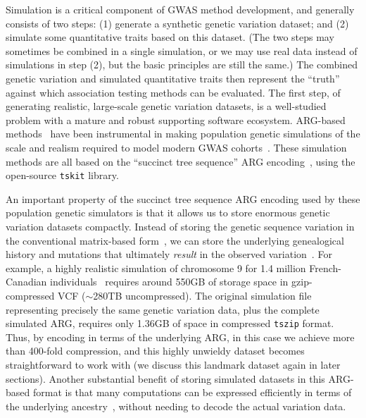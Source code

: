 \documentclass[unnumsec,webpdf,modern,large,namedate]{oup-authoring-template}%
\begin{document}
Simulation is a critical component of GWAS method development, and
generally consists of two steps: (1) generate a synthetic genetic
variation dataset; and (2) simulate some quantitative traits
based on this dataset.
(The two steps may sometimes be combined
in a single simulation, or we may use real data instead of simulations in
step (2), but the basic principles are still the same.)
The combined genetic variation and
simulated quantitative traits then represent the ``truth'' against
which association testing methods can be evaluated.
The first step, of generating realistic, large-scale genetic variation
datasets, is a well-studied problem with a mature and robust supporting
software ecosystem. ARG-based methods~\citep{kelleher2016efficient,
kelleher2018efficient,haller2018tree,adrion2020,baumdicker2022efficient,anderson2023}
have been instrumental in making population genetic simulations
of the scale and realism
required to model modern GWAS cohorts~\cite[e.g.][]{martin2017,zaidi2020}.
These simulation methods are all based on the ``succinct tree
sequence'' ARG encoding~\citep{kelleher2019,ralph2020,wong2023general},
using the open-source \texttt{tskit} library.

An important property of the succinct tree sequence ARG encoding
used by these population genetic simulators is that it allows us to
store enormous genetic variation datasets compactly. Instead of
storing the genetic sequence variation in the conventional
matrix-based form~\citep[e.g.\ VCF,][]{danecek2011},
we can store the underlying genealogical history
and mutations that ultimately \emph{result} in the observed
variation~\citep{kelleher2019}.
For example, a highly realistic simulation
of chromosome 9 for 1.4 million
French-Canadian individuals~\citep{anderson2023}
requires around 550GB of storage space in
gzip-compressed VCF ($\sim$280TB uncompressed).
The original simulation file representing
precisely the same genetic variation data, plus the
complete simulated ARG, requires only 1.36GB of space
in compressed \texttt{tszip} format. Thus,
by encoding in terms of the underlying ARG,
in this case we achieve more than 400-fold compression,
and this highly unwieldy dataset
becomes straightforward to work with (we discuss this
landmark dataset again in later sections).
Another substantial benefit of storing simulated datasets
in this ARG-based format is that many computations can
be expressed efficiently in terms of the underlying
ancestry~\citep{kelleher2016efficient,ralph2020}, without
needing to decode the actual variation data.
\end{document}
